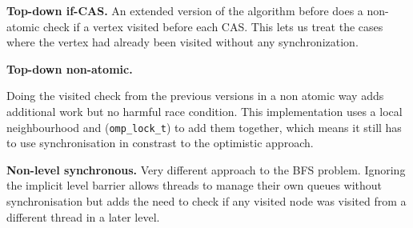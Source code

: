 \documentclass[letterpaper]{article}
\newcommand{\mypar}[1]{{\bf #1.}} %
\begin{document}
		\mypar{Top-down if-CAS}
		An extended version of the algorithm before does a non-atomic check if a vertex visited before each CAS. 
		This lets us treat the cases where the vertex had already been visited without any synchronization.

		\mypar{Top-down non-atomic}

		Doing the visited check from the previous versions in a non atomic way adds additional work but no harmful race condition.
		This implementation uses a local neighbourhood and (\verb+omp_lock_t+) to add them together, which means it still has to use synchronisation in constrast to the optimistic approach.

		\mypar{Non-level synchronous}
		Very different approach to the BFS problem. Ignoring the implicit level barrier allows threads to manage their own queues without synchronisation but adds the need to check if any visited node was visited from a different thread in a later level.

\end{document}
